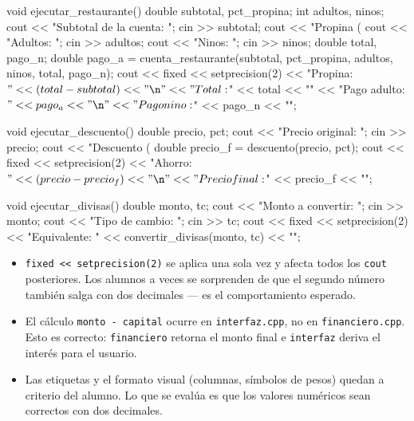 \documentclass[12pt, oneside]{article}
\begin{document}
\begin{notaprofesor}
\begin{codigo}
void ejecutar_restaurante() {
    double subtotal, pct_propina;
    int    adultos, ninos;
    cout << "Subtotal de la cuenta: "; cin >> subtotal;
    cout << "Propina (%
    cout << "Adultos:               "; cin >> adultos;
    cout << "Ninos:                 "; cin >> ninos;
    double total, pago_n;
    double pago_a = cuenta_restaurante(subtotal, pct_propina,
                                       adultos, ninos,
                                       total, pago_n);
    cout << fixed << setprecision(2)
         << "Propina:     $" << (total - subtotal) << "\n"
         << "Total:       $" << total               << "\n"
         << "Pago adulto: $" << pago_a              << "\n"
         << "Pago nino:   $" << pago_n              << "\n";
}

void ejecutar_descuento() {
    double precio, pct;
    cout << "Precio original: "; cin >> precio;
    cout << "Descuento (%
    double precio_f = descuento(precio, pct);
    cout << fixed << setprecision(2)
         << "Ahorro:       $" << (precio - precio_f) << "\n"
         << "Precio final: $" << precio_f             << "\n";
}

void ejecutar_divisas() {
    double monto, tc;
    cout << "Monto a convertir: "; cin >> monto;
    cout << "Tipo de cambio:    "; cin >> tc;
    cout << fixed << setprecision(2)
         << "Equivalente: " << convertir_divisas(monto, tc) << "\n";
}
\end{codigo}

  \begin{itemize}
    \item \texttt{fixed << setprecision(2)} se aplica una sola vez
          y afecta todos los \texttt{cout} posteriores.  Los alumnos
          a veces se sorprenden de que el segundo número también salga
          con dos decimales — es el comportamiento esperado.
    \item El cálculo \texttt{monto - capital} ocurre en
          \texttt{interfaz.cpp}, no en \texttt{financiero.cpp}.
          Esto es correcto: \texttt{financiero} retorna el monto final
          e \texttt{interfaz} deriva el interés para el usuario.
    \item Las etiquetas y el formato visual (columnas, símbolos de
          pesos) quedan a criterio del alumno.  Lo que se evalúa
          es que los valores numéricos sean correctos con
          dos decimales.
  \end{itemize}
\end{notaprofesor}
\end{document}
